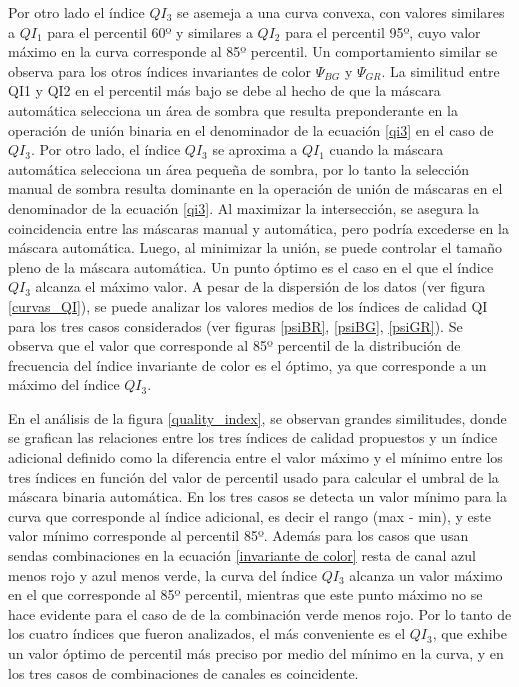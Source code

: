Por otro lado el índice $QI_3$ se asemeja a una curva convexa, con valores similares a $QI_1$ para el percentil 60º y similares a $QI_2$ para el percentil 95º, cuyo valor máximo en la curva corresponde al 85º percentil. Un comportamiento similar se observa para los otros índices invariantes de color $\Psi_{BG}$ y $\Psi_{GR}$. La similitud entre QI1 y QI2 en el percentil más bajo se debe al hecho de que la máscara automática selecciona un área de sombra que resulta preponderante en la operación de unión binaria en el denominador de la ecuación \ref{qi3} en el caso de $QI_3$.
Por otro lado, el índice $QI_3$ se aproxima a $QI_1$ cuando la máscara automática selecciona un área pequeña de sombra, por lo tanto la selección manual de sombra resulta dominante en la operación de unión de máscaras en el denominador de la ecuación \ref{qi3}.
Al maximizar la intersección, se asegura la coincidencia entre las máscaras manual y automática, pero podría excederse en la máscara automática. Luego, al minimizar la unión, se puede controlar el tamaño pleno de la máscara automática. Un punto óptimo es el caso en el que el índice $QI_3$ alcanza el máximo valor. A pesar de la dispersión de los datos (ver figura \ref{curvas_QI}), se puede analizar los valores medios de los índices de calidad QI para los tres casos considerados (ver figuras \ref{psiBR}, \ref{psiBG}, \ref{psiGR}). Se observa que el valor que corresponde al 85º percentil de la distribución de frecuencia del índice invariante de color es el óptimo, ya que corresponde a un máximo del índice $QI_3$.

En el análisis de la figura \ref{quality_index}, se observan grandes similitudes, donde se grafican las relaciones entre los tres índices de calidad propuestos y un índice adicional definido como la diferencia entre el valor máximo y el mínimo entre los tres índices en función del valor de percentil usado para calcular el umbral de la máscara binaria automática. En los tres casos se detecta un valor mínimo para la curva que corresponde al índice adicional, es decir el rango (max - min), y este valor mínimo corresponde al percentil 85º. Además para los casos que usan sendas combinaciones en la ecuación \ref{invariante de color} resta de canal azul menos rojo y azul menos verde, la curva del índice $QI_3$ alcanza un valor máximo en el que corresponde al 85º percentil, mientras que este punto máximo no se hace evidente para el caso de de la combinación verde menos rojo. Por lo tanto de los cuatro índices que fueron analizados, el más conveniente es el $QI_3$, que exhibe un valor óptimo de percentil más preciso por medio del mínimo en la curva, y en los tres casos de combinaciones de canales es coincidente.

